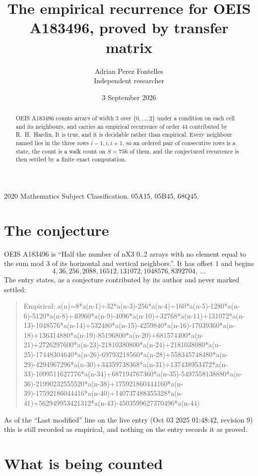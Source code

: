 \documentclass[11pt,a4paper]{article}
\title{The empirical recurrence for OEIS A183496, proved by transfer matrix}
\author{Adrian Perez Fontelles\\ \small Independent researcher}
\date{3 September 2026}
\theoremstyle{plain}
\theoremstyle{definition}
\begin{document}
\maketitle

\begin{abstract}
OEIS A183496 counts arrays of width $3$ over $\{0,\dots,2\}$ under a condition on each cell
and its neighbours, and carries an empirical recurrence of order $44$ contributed by
R.~H.~Hardin. It is true, and it is decidable rather than empirical. Every neighbour named lies
in the three rows $i-1,i,i+1$, so an ordered pair of consecutive rows is a state, the count is
a walk count on $S=756$ of them, and the conjectured recurrence is then settled by a finite
exact computation.
\end{abstract}

\noindent\small 2020 Mathematics Subject Classification. 05A15, 05B45, 68Q45.\normalsize

\section{The conjecture}

OEIS A183496 is ``Half the number of nX3 0..2 arrays with no element equal to the sum mod 3 of its horizontal and vertical neighbors.''. It has offset $1$ and begins
\[
4, 36, 256, 2088, 16512, 131072, 1048576, 8392704,\ \dots
\]
The entry states, as a conjecture contributed by its author and never marked settled:
\begin{quote}
Empirical: a(n)=8*a(n-1)+32*a(n-3)-256*a(n-4)+160*a(n-5)-1280*a(n-6)-5120*a(n-8)+40960*a(n-9)-4096*a(n-10)+32768*a(n-11)+131072*a(n-13)-1048576*a(n-14)+532480*a(n-15)-4259840*a(n-16)-17039360*a(n-18)+136314880*a(n-19)-85196800*a(n-20)+681574400*a(n-21)+2726297600*a(n-23)-21810380800*a(n-24)+2181038080*a(n-25)-17448304640*a(n-26)-69793218560*a(n-28)+558345748480*a(n-29)-4294967296*a(n-30)+34359738368*a(n-31)+137438953472*a(n-33)-1099511627776*a(n-34)+687194767360*a(n-35)-5497558138880*a(n-36)-21990232555520*a(n-38)+175921860444160*a(n-39)-17592186044416*a(n-40)+140737488355328*a(n-41)+562949953421312*a(n-43)-4503599627370496*a(n-44)
\end{quote}
As of the ``Last modified'' line on the live entry (Oct 03 2025 01:48:42, revision 9) this is still
recorded as empirical, and nothing on the entry records it as proved.

\section{What is being counted}
\end{document}
